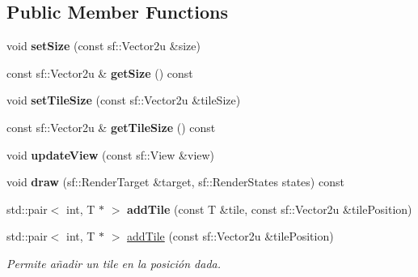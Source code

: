 \subsection*{Public Member Functions}
\begin{DoxyCompactItemize}
\item 
\mbox{\label{classzt_1_1_tilemap_layer_afe899acb9ffba9fba70e0913595f124c}} 
void {\bfseries set\+Size} (const sf\+::\+Vector2u \&size)
\item 
\mbox{\label{classzt_1_1_tilemap_layer_a8990bba160dd50c39a6abcf803bb58e0}} 
const sf\+::\+Vector2u \& {\bfseries get\+Size} () const
\item 
\mbox{\label{classzt_1_1_tilemap_layer_a51c80b285c7128b1ff48f5efe34b302f}} 
void {\bfseries set\+Tile\+Size} (const sf\+::\+Vector2u \&tile\+Size)
\item 
\mbox{\label{classzt_1_1_tilemap_layer_a0711254a5302e3cce7d19f269a48bff7}} 
const sf\+::\+Vector2u \& {\bfseries get\+Tile\+Size} () const
\item 
\mbox{\label{classzt_1_1_tilemap_layer_a18d1e2f04247e83bac25d5ec03870b8b}} 
void {\bfseries update\+View} (const sf\+::\+View \&view)
\item 
\mbox{\label{classzt_1_1_tilemap_layer_a187ec1100dcd2f02eac6f2ba32d1bf4e}} 
void {\bfseries draw} (sf\+::\+Render\+Target \&target, sf\+::\+Render\+States states) const
\item 
\mbox{\label{classzt_1_1_tilemap_layer_a042b846c7958ac5fe1f82250c6cc1d3f}} 
std\+::pair$<$ int, T $\ast$ $>$ {\bfseries add\+Tile} (const T \&tile, const sf\+::\+Vector2u \&tile\+Position)
\item 
std\+::pair$<$ int, T $\ast$ $>$ \hyperlink{classzt_1_1_tilemap_layer_a6fe52aa49bd4965ac7df8a6db0187f5a}{add\+Tile} (const sf\+::\+Vector2u \&tile\+Position)
\begin{DoxyCompactList}\small\item\em Permite añadir un tile en la posición dada. \end{DoxyCompactList}\item 

\end{DoxyCompactItemize}
